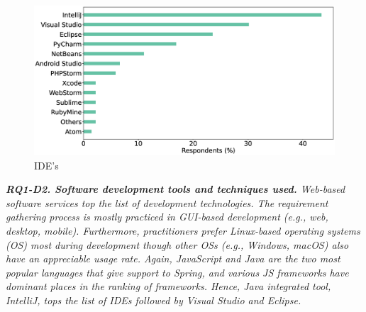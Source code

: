 \begin{figure}[t]
\centering
  \includegraphics[scale=0.18]{Figures/Respondents_IDEs}
  \caption{IDE's}
  \label{fig:IDEs}
\end{figure}
\begin{tcolorbox}[flushleft upper,boxrule=1pt,arc=0pt,left=0pt,right=0pt,top=0pt,bottom=0pt,colback=white,after=\ignorespacesafterend\par\noindent]
\nd\it{\bf{RQ1-D2. Software development tools and techniques used.}} Web-based software services top the list of development technologies. The requirement gathering process is mostly practiced in GUI-based development (e.g., web, desktop, mobile). Furthermore, practitioners prefer Linux-based operating systems (OS) most during development though other OSs (e.g., Windows, macOS) also have an appreciable usage rate. Again, JavaScript and Java are the two most popular languages that give support to Spring, and various JS frameworks have dominant places in the ranking of frameworks. Hence, Java integrated tool, IntelliJ, tops the list of IDEs followed by Visual Studio and Eclipse.  
\end{tcolorbox}
